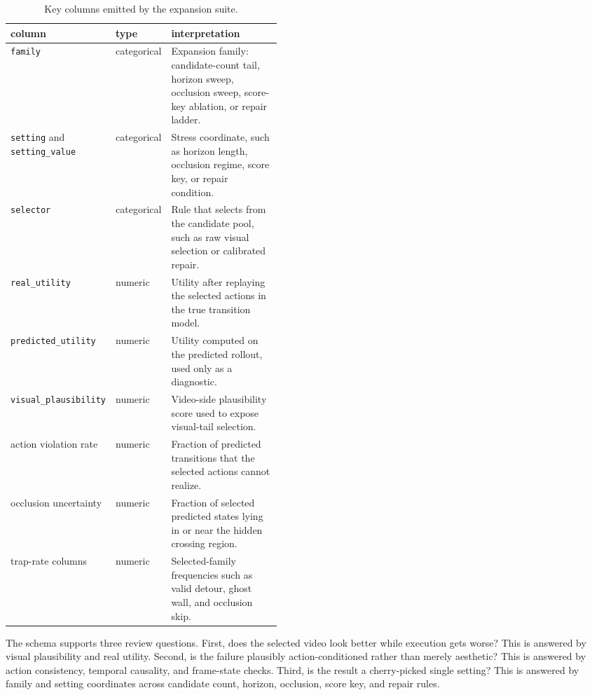 \documentclass{article}
\begin{document}
\begin{table}[tbp]
  \centering
  \small
  \caption{Key columns emitted by the expansion suite.}
  \label{tab:schema}
  \begin{tabularx}{\linewidth}{@{}p{0.27\linewidth}p{0.18\linewidth}X@{}}
    \toprule
    column & type & interpretation \\
    \midrule
    \texttt{family} & categorical & Expansion family: candidate-count tail, horizon sweep, occlusion sweep, score-key ablation, or repair ladder. \\
    \texttt{setting} and \texttt{setting\_value} & categorical & Stress coordinate, such as horizon length, occlusion regime, score key, or repair condition. \\
    \texttt{selector} & categorical & Rule that selects from the candidate pool, such as raw visual selection or calibrated repair. \\
    \texttt{real\_utility} & numeric & Utility after replaying the selected actions in the true transition model. \\
    \texttt{predicted\_utility} & numeric & Utility computed on the predicted rollout, used only as a diagnostic. \\
    \texttt{visual\_plausibility} & numeric & Video-side plausibility score used to expose visual-tail selection. \\
    action violation rate & numeric & Fraction of predicted transitions that the selected actions cannot realize. \\
    occlusion uncertainty & numeric & Fraction of selected predicted states lying in or near the hidden crossing region. \\
    trap-rate columns & numeric & Selected-family frequencies such as valid detour, ghost wall, and occlusion skip. \\
    \bottomrule
  \end{tabularx}
\end{table}

The schema supports three review questions. First, does the selected video look better while execution gets worse? This is answered by visual plausibility and real utility. Second, is the failure plausibly action-conditioned rather than merely aesthetic? This is answered by action consistency, temporal causality, and frame-state checks. Third, is the result a cherry-picked single setting? This is answered by family and setting coordinates across candidate count, horizon, occlusion, score key, and repair rules.
\end{document}
